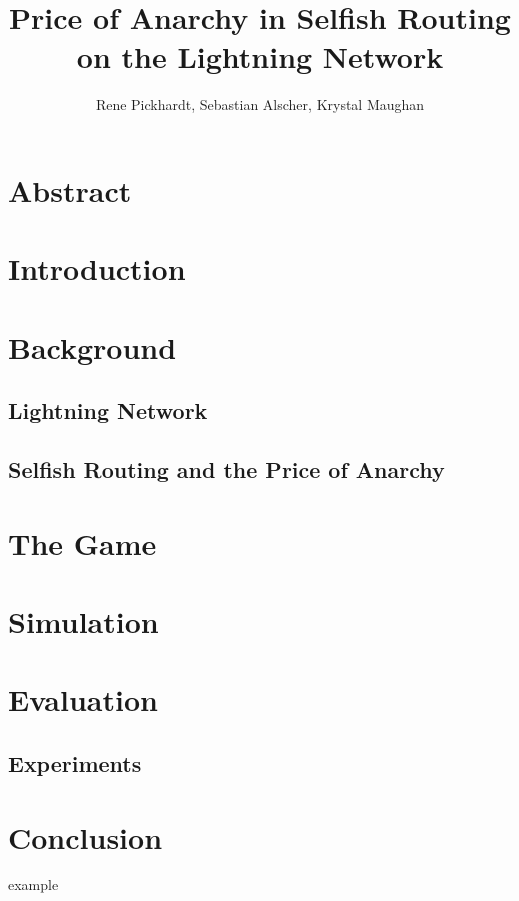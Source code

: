 \documentclass[10pt]{article}
\title{Price of Anarchy in Selfish Routing on the Lightning Network}
\author{ Rene Pickhardt, Sebastian Alscher, Krystal Maughan}
\date{}
\newcommand{\mynote}[2]
    {{\color{red} \fbox{\bfseries\sffamily\scriptsize#1}
    {\small$\blacktriangleright$\textsf{\emph{#2}}$\blacktriangleleft$}}~}
\newcommand{\jn}[1]{\mynote{JN}{#1}}
\renewcommand{\jn}[1]{}
\begin{document}
\maketitle


\section*{Abstract}

\section*{Introduction}

\section*{Background}
\subsection{Lightning Network}
\subsection{Selfish Routing and the Price of Anarchy}

\section*{The Game}

\section*{Simulation}

\section{Evaluation}

\subsection{Experiments}

\section{Conclusion}
example \cite{guidi2019} \cite{SHI2020498}


\end{document}
